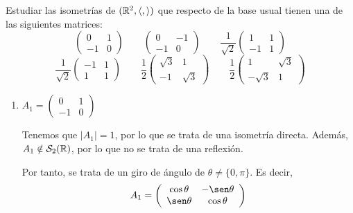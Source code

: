 \begin{ejercicio}
    Estudiar las isometrías de $(\mathbb{R}^2,\langle ,\rangle)$ que respecto de la base usual tienen una de las siguientes matrices:
    \begin{equation*}
        \left(\begin{array}{cc}
            0 & 1 \\
            -1 & 0
        \end{array}\right)
        \qquad
        \left(\begin{array}{cc}
            0 & -1 \\
            -1 & 0
        \end{array}\right)
        \qquad
        \frac{1}{\sqrt{2}}\left(\begin{array}{cc}
            1 & 1 \\
            -1 & 1
        \end{array}\right)
    \end{equation*}
    \begin{equation*}
        \frac{1}{\sqrt{2}}\left(\begin{array}{cc}
            -1 & 1 \\
            1 & 1
        \end{array}\right)
        \qquad
        \frac{1}{2}\left(\begin{array}{cc}
            \sqrt{3} & 1 \\
            -1 & \sqrt{3}
        \end{array}\right)
        \qquad
        \frac{1}{2}\left(\begin{array}{cc}
            1 & \sqrt{3} \\
            -\sqrt{3} & 1
        \end{array}\right)
    \end{equation*}

    \begin{enumerate}
        \item $A_1=\left(\begin{array}{cc}
            0 & 1 \\
            -1 & 0
        \end{array}\right)$

        Tenemos que $|A_1|=1$, por lo que se trata de una isometría directa. Además, $A_1\notin \mathcal{S}_2(\mathbb{R})$, por lo que no se trata de una reflexión.

        Por tanto, se trata de un giro de ángulo de $\theta\neq \{0,\pi\}$. Es decir,
        \begin{equation*}
            A_1=\left(\begin{array}{cc}
                \cos \theta & -\sen \theta \\
                \sen \theta & \cos \theta
            \end{array}\right)
        \end{equation*}


\end{enumerate}
\end{ejercicio}
